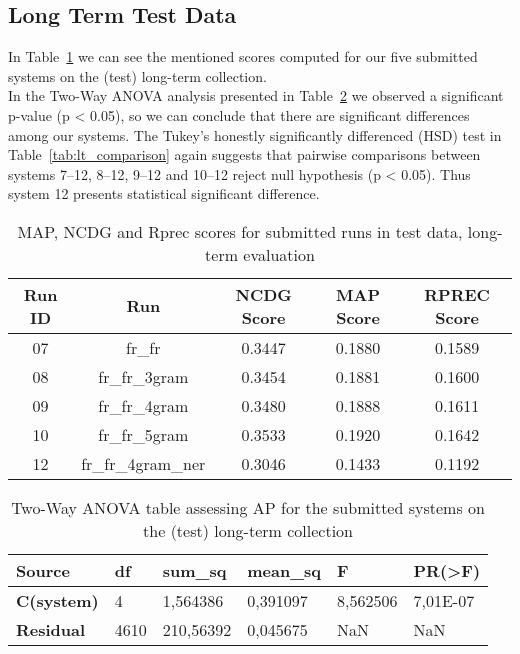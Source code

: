\subsection{Long Term Test Data}\label{subsec:long_term}

In Table~\ref{tab:lt_scores} we can see the mentioned scores computed for our five submitted systems on the (test)
long-term collection.\\

In the Two-Way ANOVA analysis presented in Table~\ref{tab:lt_anova} we observed a significant p-value (p < 0.05), so we
can conclude that there are significant differences among our systems.
The Tukey's honestly significantly differenced (HSD) test in Table~\ref{tab:lt_comparison} again suggests that pairwise
comparisons between systems 7--12, 8--12, 9--12 and 10--12 reject null hypothesis (p < 0.05).
Thus system 12 presents statistical significant difference.

\begin{table}[h!]
    \begin{center}
        \caption{MAP, NCDG and Rprec scores for submitted runs in test data, long-term evaluation}
        \label{tab:lt_scores}
        \begin{tabular}{|c|c||c|c|c|}
            \hline
            \textbf{Run ID} & \textbf{Run} & \textbf{NCDG Score} & \textbf{MAP Score} & \textbf{RPREC Score}\\
            \hline\hline
            07 & fr\_fr & 0.3447 & 0.1880 & 0.1589 \\
            \hline
            08 & fr\_fr\_3gram & 0.3454 & 0.1881 & 0.1600 \\
            \hline
            09 & fr\_fr\_4gram & 0.3480 & 0.1888 & 0.1611 \\
            \hline
            10 & fr\_fr\_5gram & 0.3533 & 0.1920 & 0.1642 \\
            \hline
            12 & fr\_fr\_4gram\_ner & 0.3046 & 0.1433 & 0.1192\\
            \hline
        \end{tabular}
    \end{center}
\end{table}

\begin{table}[!ht]
    \centering
    \caption{Two-Way ANOVA table assessing AP for the submitted systems on the (test) long-term collection}
    \label{tab:lt_anova}
    \begin{tabular}{|l|l|l|l|l|l|}
    \hline
        \textbf{Source} & \textbf{df} & \textbf{sum\_sq} & \textbf{mean\_sq} & \textbf{F} & \textbf{PR(>F)} \\ \hline\hline
        \textbf{C(system)} & 4 & 1,564386 & 0,391097 & 8,562506 & 7,01E-07 \\ \hline
        \textbf{Residual} & 4610 & 210,56392 & 0,045675 & NaN & NaN \\ \hline
    \end{tabular}
\end{table}


